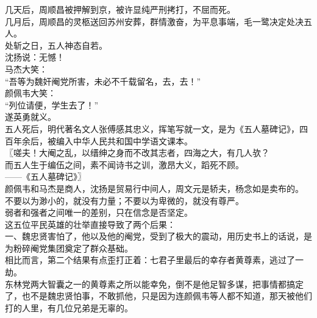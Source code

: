 \begin{multicols}{\theparacolNo}
几天后，周顺昌被押解到京，被许显纯严刑拷打，不屈而死。\\

几月后，周顺昌的灵柩送回苏州安葬，群情激奋，为平息事端，毛一鹭决定处决五人。\\

处斩之日，五人神态自若。\\

沈扬说：无憾！\\

马杰大笑：\\

“吾等为魏奸阉党所害，未必不千载留名，去，去！”\\

颜佩韦大笑：\\

“列位请便，学生去了！”\\

遂英勇就义。\\

五人死后，明代著名文人张傅感其忠义，挥笔写就一文，是为《五人墓碑记》，四百年余后，被编入中华人民共和国中学语文课本。\\

〖嗟夫！大阉之乱，以缙绅之身而不改其志者，四海之大，有几人欤？\\

而五人生于编伍之间，素不闻诗书之训，激昂大义，蹈死不顾。\\

——《五人墓碑记》〗\\

颜佩韦和马杰是商人，沈扬是贸易行中间人，周文元是轿夫，杨念如是卖布的。\\

不要以为渺小的，就没有力量；不要以为卑微的，就没有尊严。\\

弱者和强者之间唯一的差别，只在信念是否坚定。\\

这五位平民英雄的壮举直接导致了两个后果：\\

一、魏忠贤害怕了，他以及他的阉党，受到了极大的震动，用历史书上的话说，是为粉碎阉党集团奠定了群众基础。\\

相比而言，第二个结果有点歪打正着：七君子里最后的幸存者黄尊素，逃过了一劫。\\

东林党两大智囊之一的黄尊素之所以能幸免，倒不是他足智多谋，把事情都搞定了，也不是魏忠贤怕事，不敢抓他，只是因为连颜佩韦等人都不知道，那天被他们打的人里，有几位兄弟是无辜的。\\


\end{multicols}
